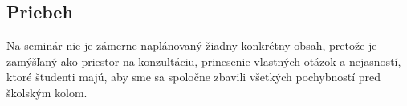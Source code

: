 
\subsection*{Priebeh}

Na seminár nie je zámerne naplánovaný žiadny konkrétny obsah, pretože je zamýšľaný ako priestor na konzultáciu, prinesenie vlastných otázok a nejasností, ktoré študenti majú, aby sme sa spoločne zbavili všetkých pochybností pred školským kolom.
